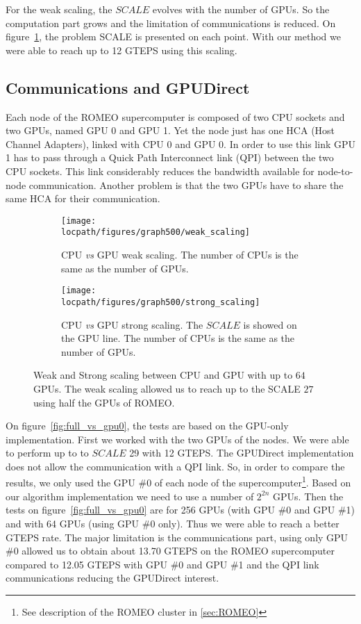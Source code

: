 For the weak scaling, the $SCALE$ evolves with the number of GPUs. 
So the computation part grows and the limitation of communications is reduced. 
On figure~\ref{fig:bfs_weak_scaling}, the problem SCALE is presented on each point. 
With our method we were able to reach up to 12 GTEPS using this scaling. 

\subsection{Communications and GPUDirect}

Each node of the ROMEO supercomputer is composed of two CPU sockets and two GPUs, named GPU 0 and GPU 1.
Yet the node just has one HCA (Host Channel Adapters), linked with CPU 0 and GPU 0. 
In order to use this link GPU 1 has to pass through a Quick Path Interconnect link (QPI) between the two CPU sockets. 
This link considerably reduces the bandwidth available for node-to-node communication. 
Another problem is that the two GPUs have to share the same HCA for their communication. 


\begin{figure}[htb]
\begin{subfigure}[t]{0.48\linewidth}
\centering
\texttt{[image: \\locpath/figures/graph500/weak\_scaling]}
\caption[]{CPU \textit{vs} GPU weak scaling. The number of CPUs is the same as the number of GPUs.}
\label{fig:bfs_weak_scaling}
\end{subfigure}
\hfill
\begin{subfigure}[t]{0.48\linewidth}
\centering
\texttt{[image: \\locpath/figures/graph500/strong\_scaling]}
\caption[]{CPU \textit{vs} GPU strong scaling. The $SCALE$ is showed on the GPU line. The number of CPUs is the same as the number of GPUs.}
\label{fig:bfs_strong_scaling}
\end{subfigure}
\caption[Weak and Strong scaling comparison up to $64$ GPUs]{Weak and Strong scaling between CPU and GPU with up to $64$ GPUs. The weak scaling allowed us to reach up to the SCALE $27$ using half the GPUs of ROMEO.}
\end{figure}


On figure~\ref{fig:full_vs_gpu0}, the tests are based on the GPU-only implementation. 
First we worked with the two GPUs of the nodes. 
We were able to perform up to to $SCALE$ 29 with 12 GTEPS. 
The GPUDirect implementation does not allow the communication with a QPI link. 
So, in order to compare the results, we only used the GPU \#0 of each node of the supercomputer\footnote{See description of the ROMEO cluster in \ref{sec:ROMEO}}. 
Based on our algorithm implementation we need to use a number of $2^{2n}$ GPUs. 
Then the tests on figure~\ref{fig:full_vs_gpu0} are for 256 GPUs (with GPU \#0 and GPU \#1) and with 64 GPUs (using GPU \#0 only). 
Thus we were able to reach a better GTEPS rate. 
The major limitation is the communications part, using only GPU \#0 allowed us to obtain about 13.70 GTEPS on the ROMEO supercomputer compared to 12.05 GTEPS with GPU \#0 and GPU \#1 and the QPI link communications reducing the GPUDirect interest.

